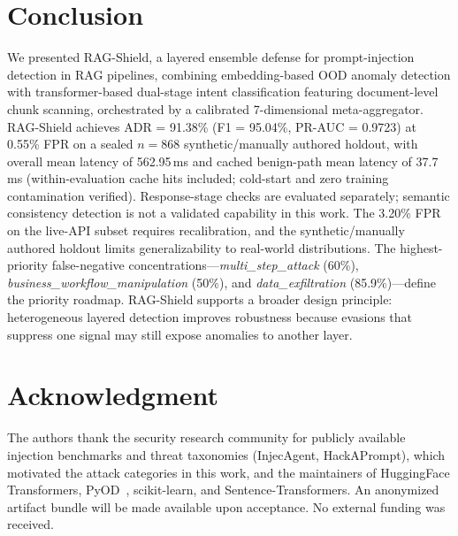﻿\documentclass[conference]{IEEEtran}
\begin{document}
\section{Conclusion}

We presented RAG-Shield, a layered ensemble defense for prompt-injection
detection in RAG pipelines, combining embedding-based OOD anomaly detection
with transformer-based dual-stage intent classification featuring
document-level chunk scanning, orchestrated by a calibrated 7-dimensional
meta-aggregator.
RAG-Shield achieves ADR = 91.38\% (F1 = 95.04\%, PR-AUC = 0.9723) at
0.55\% FPR on a sealed $n = 868$ synthetic/manually authored holdout, with
overall mean latency of 562.95\,ms and cached benign-path mean latency of
37.7\,ms (within-evaluation cache hits included; cold-start and zero training
contamination verified).
Response-stage checks are evaluated separately; semantic consistency
detection is not a validated capability in this work.
The 3.20\% FPR on the live-API subset requires recalibration, and the
synthetic/manually authored holdout limits generalizability to real-world
distributions.
The highest-priority false-negative concentrations---\textit{multi\_step\_attack}
(60\%), \textit{business\_workflow\_manipulation} (50\%), and
\textit{data\_exfiltration} (85.9\%)---define the priority roadmap.
RAG-Shield supports a broader design principle: heterogeneous layered
detection improves robustness because evasions that suppress one signal may
still expose anomalies to another layer.

\section*{Acknowledgment}
The authors thank the security research community for publicly available
injection benchmarks and threat taxonomies (InjecAgent, HackAPrompt), which
motivated the attack categories in this work, and the maintainers of
HuggingFace Transformers, PyOD~\cite{zhao2019pyod}, scikit-learn, and
Sentence-Transformers.
An anonymized artifact bundle will be made available upon acceptance.
No external funding was received.
\end{document}
